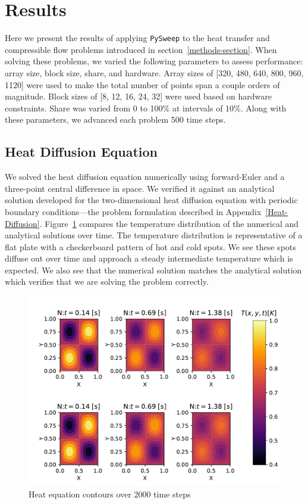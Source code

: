 \documentclass[preprints,article,accept,moreauthors,pdftex]{Definitions/mdpi}
\def\pysweep{\texttt{PySweep}}
\newcommand\fs{0.7}
\begin{document}
\section{Results}
\label{results-section}

Here we present the results of applying \pysweep{} to the heat transfer and compressible flow problems introduced in section~\ref{methods-section}. When solving these problems, we varied the following parameters to assess performance: array size, block size, share, and hardware. Array sizes of [320, 480, 640, 800, 960, 1120] were used to make the total number of points span a couple orders of magnitude. Block sizes of [8, 12, 16, 24, 32] were used based on hardware constraints. Share was varied from 0 to 100\% at intervals of 10\%. Along with these parameters, we advanced each problem 500 time steps.

\subsection{Heat Diffusion Equation}
\label{hdeResults}
We solved the heat diffusion equation numerically using forward-Euler and a three-point central difference in space. We verified it against an analytical solution developed for the two-dimensional heat diffusion equation with periodic boundary conditions---the problem formulation described in Appendix~\ref{Heat-Diffusion}. Figure~\ref{fig:heatSurface} compares the temperature distribution of the numerical and analytical solutions over time. The temperature distribution is representative of a flat plate with a checkerboard pattern of hot and cold spots. We see these spots diffuse out over time and approach a steady intermediate temperature which is expected. We also see that the numerical solution matches the analytical solution which verifies that we are solving the problem correctly.

\begin{figure}[H]
    
    \begin{center}
        \includegraphics[scale=\fs, trim={0.9cm 0.4cm 0.1cm 0.9cm},clip]{figs/heatValidate.pdf}
    \end{center}
    \caption{Heat equation contours over 2000 time steps}
    \label{fig:heatSurface}
\end{figure}
\end{document}
